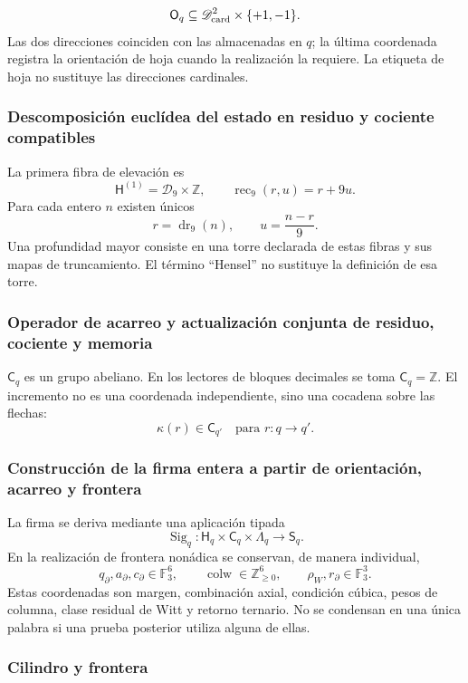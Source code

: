 {\[
 \mathsf O_q\subseteq
 \mathscr D_{\rm card}^2\times\{+1,-1\}.
\]
Las dos direcciones coinciden con las almacenadas en \(q\); la última
coordenada registra la orientación de hoja cuando la realización la requiere.
La etiqueta de hoja no sustituye las direcciones cardinales.

\subsubsection{Descomposición euclídea del estado en residuo y cociente compatibles}

La primera fibra de elevación es
\[
 \mathsf H^{(1)}=\mathcal D_9\times\mathbb Z,
 \qquad
 \operatorname{rec}_9(r,u)=r+9u.
\]
Para cada entero \(n\) existen únicos
\[
 r=\operatorname{dr}_9(n),
 \qquad
 u=\frac{n-r}{9}.
\]
Una profundidad mayor consiste en una torre declarada de estas fibras y sus
mapas de truncamiento. El término ``Hensel'' no sustituye la definición de
esa torre.

\subsubsection{Operador de acarreo y actualización conjunta de residuo, cociente y memoria}

\(\mathsf C_q\) es un grupo abeliano. En los lectores de bloques decimales
se toma \(\mathsf C_q=\mathbb Z\). El incremento no es una coordenada
independiente, sino una cocadena sobre las flechas:
\[
 \kappa(r)\in\mathsf C_{q'}
 \quad\text{para }r:q\to q'.
\]

\subsubsection{Construcción de la firma entera a partir de orientación, acarreo y frontera}

La firma se deriva mediante una aplicación tipada
\[
 \operatorname{Sig}_q:
 \mathsf H_q\times\mathsf C_q\times\Lambda_q
 \longrightarrow\mathsf S_q.
\]
En la realización de frontera nonádica se conservan, de manera individual,
\[
 q_\partial,a_\partial,c_\partial\in\mathbb F_3^6,
 \qquad
 \operatorname{colw}\in\mathbb Z_{\geq0}^{6},
 \qquad
 \rho_W,r_\partial\in\mathbb F_3^3.
\]
Estas coordenadas son margen, combinación axial, condición cúbica, pesos de
columna, clase residual de Witt y retorno ternario. No se condensan en una
única palabra si una prueba posterior utiliza alguna de ellas.

\subsubsection{Cilindro y frontera}

}
